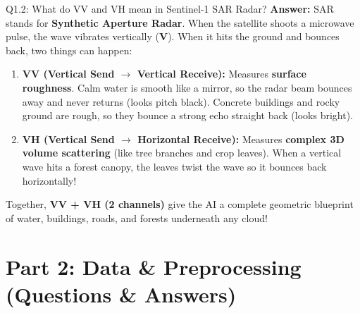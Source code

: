 \documentclass[11pt,a4paper]{article}
\begin{document}
\begin{qbox}{Q1.2: What do VV and VH mean in Sentinel-1 SAR Radar?}
\textbf{Answer:}
SAR stands for \textbf{Synthetic Aperture Radar}. When the satellite shoots a microwave pulse, the wave vibrates vertically (\textbf{V}). When it hits the ground and bounces back, two things can happen:
\begin{enumerate}[leftmargin=18pt]
    \item \textbf{VV (Vertical Send $\to$ Vertical Receive):} Measures \textbf{surface roughness}. Calm water is smooth like a mirror, so the radar beam bounces away and never returns (looks pitch black). Concrete buildings and rocky ground are rough, so they bounce a strong echo straight back (looks bright).
    \item \textbf{VH (Vertical Send $\to$ Horizontal Receive):} Measures \textbf{complex 3D volume scattering} (like tree branches and crop leaves). When a vertical wave hits a forest canopy, the leaves twist the wave so it bounces back horizontally!
\end{enumerate}
Together, \textbf{VV + VH (2 channels)} give the AI a complete geometric blueprint of water, buildings, roads, and forests underneath any cloud!
\end{qbox}

\newpage

\section{Part 2: Data \& Preprocessing (Questions \& Answers)}
\end{document}
